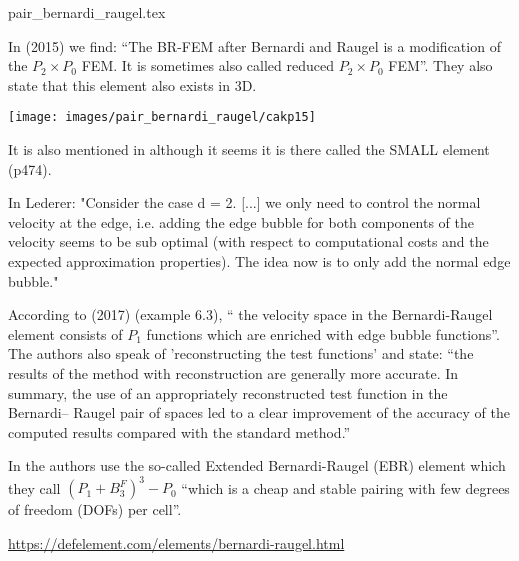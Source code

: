 \begin{flushright} {\tiny {\color{gray} pair\_bernardi\_raugel.tex}} \end{flushright}

In \textcite{cakp15} (2015) we find: ``The BR-FEM after Bernardi and Raugel \cite{bera85} 
is a modification of the $P_2\times P_0$ FEM. It is sometimes also called reduced $P_2\times P_0$ FEM''.
They also state that this element also exists in 3D.

\begin{center}
\texttt{[image: images/pair\_bernardi\_raugel/cakp15]}
\end{center}

It is also mentioned in \textcite{bobf13} although it seems it is there called the SMALL element (p474).

In Lederer: "Consider the case d = 2. [...] we only need to control 
the normal velocity at the edge, i.e. adding the
edge bubble for both components of the velocity seems to be sub optimal (with respect to
computational costs and the expected approximation properties). The idea now is to only
add the normal edge bubble."

According to \textcite{jolm17} (2017) (example 6.3), `` the velocity space in the Bernardi-Raugel
element consists of $P_1$ functions which are enriched with edge bubble functions''.
The authors also speak of 'reconstructing the test functions' and state: 
``the results of the method with reconstruction are generally more accurate.
In summary, the use of an appropriately reconstructed test function in the Bernardi–
Raugel pair of spaces led to a clear improvement of the accuracy of the computed
results compared with the standard method.''

In \cite{befh21} the authors use the so-called Extended Bernardi-Raugel (EBR) element
which they call $(P_1 + B_3^F)^3 - P_0$ ``which is a cheap and stable pairing with few degrees of
freedom (DOFs) per cell''.

\url{https://defelement.com/elements/bernardi-raugel.html}


